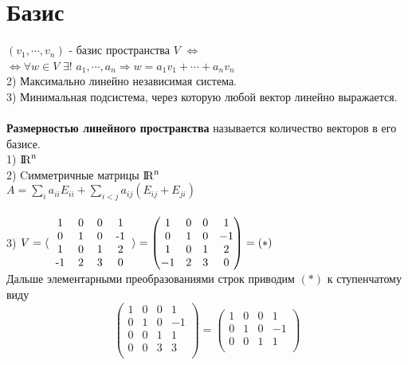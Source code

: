 \documentclass[a4paper,11pt]{report}
\DeclareMathOperator{\Mn}{{\rm I\!R}^{n}}
\begin{document}
\section{Базис}
$(v_1, \cdots, v_n)$ - базис пространства $V$ $\Leftrightarrow$\\
$\Leftrightarrow \forall w \in V $ $\exists!$ $ a_1, \cdots, a_n \Rightarrow w = a_1v_1 + \cdots + a_nv_n$\\
2) Максимально линейно независимая система.\\
3) Минимальная подсистема, через которую любой вектор линейно выражается.\\
\\
\textbf{Размерностью линейного пространства} называется количество векторов в его базисе.\\
1) $\Mn$\\
2) Cимметричные матрицы $\Mn$\\
$A = \sum_i{a_{ii}E_{ii}} + \sum_{i < j}{a_{ij}(E_{ij} + E_{ji})}$\\
\\
3)
$V = \langle 
\begin{tabular}{cccc}
1 & 0 & 0 & 1\\
0 & 1 & 0 & -1\\
1 & 0 & 1 & 2\\
-1 & 2 & 3 & 0\\
\end{tabular}
\rangle
=
\begin{pmatrix}
1 & 0 & 0 & 1\\
0 & 1 & 0 & -1\\
1 & 0 & 1 & 2\\
-1 & 2 & 3 & 0\\
\end{pmatrix}
= (*)
$\\
Дальше элементарными преобразованиями строк приводим $(*)$ к ступенчатому виду\\
\[
\begin{pmatrix}
1 & 0 & 0 & 1\\
0 & 1 & 0 & -1\\
0 & 0 & 1 & 1\\
0 & 0 & 3 & 3\\
\end{pmatrix}
=
\begin{pmatrix}
1 & 0 & 0 & 1\\
0 & 1 & 0 & -1\\
0 & 0 & 1 & 1\\
\end{pmatrix}
\]\\
\end{document}
